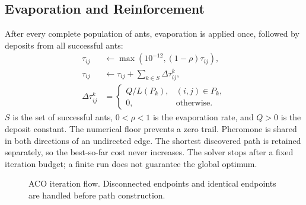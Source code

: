 \documentclass[conference]{IEEEtran}
\begin{document}
\subsection{Evaporation and Reinforcement}
After every complete population of ants, evaporation is applied once, followed by deposits from all successful ants:
\begin{align}
\tau_{ij} &\leftarrow \max(10^{-12},(1-\rho)\tau_{ij}),\\
\tau_{ij} &\leftarrow \tau_{ij}+\sum_{k\in S}\Delta\tau_{ij}^{k},\\
\Delta\tau_{ij}^{k} &=
\begin{cases}Q/L(P_k),&(i,j)\in P_k,\\0,&\text{otherwise.}\end{cases}
\end{align}
$S$ is the set of successful ants, $0<\rho<1$ is the evaporation rate, and $Q>0$ is the deposit constant. The numerical floor prevents a zero trail. Pheromone is shared in both directions of an undirected edge. The shortest discovered path is retained separately, so the best-so-far cost never increases. The solver stops after a fixed iteration budget; a finite run does not guarantee the global optimum.

\begin{figure}[tb]
\centering
{}
\caption{ACO iteration flow. Disconnected endpoints and identical endpoints are handled before path construction.}
\label{fig:flow}
\end{figure}
\end{document}
